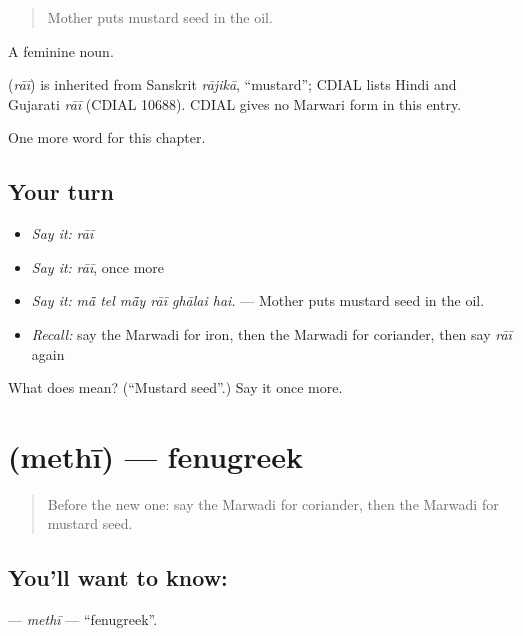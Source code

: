 \begin{quote}
Mother puts mustard seed in the oil.
\end{quote}

A feminine noun.

\begin{cousinweb}
\textbf{} (\emph{rāī}) is inherited from Sanskrit \emph{rājikā}, \textquotedblleft{}mustard\textquotedblright{}; CDIAL lists Hindi and Gujarati \emph{rāī} (CDIAL 10688). CDIAL gives no Marwari form in this entry.
\end{cousinweb}

\begin{grammarlens}[title={What you've built}]
One more word for this chapter.
\end{grammarlens}

\subsection*{Your turn}
\begin{itemize}
\raggedright
  \item \emph{Say it:} \emph{rāī}
  \item \emph{Say it:} \emph{rāī}, once more
  \item \emph{Say it:} \emph{mā̃ tel mā̃y rāī ghālai hai.} — Mother puts mustard seed in the oil.
  \item \emph{Recall:} say the Marwadi for iron, then the Marwadi for coriander, then say \emph{rāī} again
\end{itemize}

\begin{tcolorbox}[breakable,colback=teal!4,colframe=teal!35!black,title={Before you move on}]
What does  mean? (\textquotedblleft{}Mustard seed\textquotedblright{}.) Say it once more.
\end{tcolorbox}
\section[\texorpdfstring{\mw{मेथी} (methī)}{मेथी (methī)}]{ (methī) — fenugreek}

\label{lesson:MW-C185-methi}



\begin{quote}
Before the new one: say the Marwadi for coriander, then the Marwadi for mustard seed.
\end{quote}

\subsection*{You'll want to know: }
\textbf{} — \emph{methī} — \textquotedblleft{}fenugreek\textquotedblright{}.

